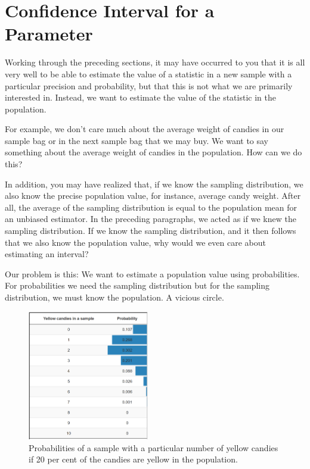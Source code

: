 \documentclass[a4paper]{book}
\theoremstyle{definition}
\theoremstyle{definition}
\theoremstyle{definition}
\theoremstyle{remark}
\begin{document}
\section{Confidence Interval for a Parameter}\label{ci-parameter}

Working through the preceding sections, it may have occurred to you that
it is all very well to be able to estimate the value of a statistic in a
new sample with a particular precision and probability, but that this is
not what we are primarily interested in. Instead, we want to estimate
the value of the statistic in the population.

For example, we don't care much about the average weight of candies in
our sample bag or in the next sample bag that we may buy. We want to say
something about the average weight of candies in the population. How can
we do this?

In addition, you may have realized that, if we know the sampling
distribution, we also know the precise population value, for instance,
average candy weight. After all, the average of the sampling
distribution is equal to the population mean for an unbiased estimator.
In the preceding paragraphs, we acted as if we knew the sampling
distribution. If we know the sampling distribution, and it then follows
that we also know the population value, why would we even care about
estimating an interval?

Our problem is this: We want to estimate a population value using
probabilities. For probabilities we need the sampling distribution but
for the sampling distribution, we must know the population. A vicious
circle.

\begin{figure}
\includegraphics[width=200px]{figures/exactapproach} \caption{Probabilities of a sample with a particular number of yellow candies if 20 per cent of the candies are yellow in the population.}\label{fig:exactapproachfigure}
\end{figure}
\end{document}
